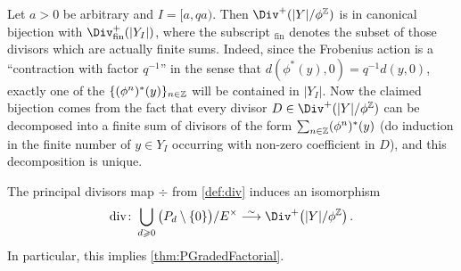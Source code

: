 \documentclass[a4paper, 10pt, oneside, DIV=9, chapterprefix=true, numbers=enddot,bibliography=totoc]{scrbook}
\begin{document}
\begin{rem}\label{rem:Div+}
	Let $a>0$ be arbitrary and $I=[a,qa)$. Then $\Div^+(|Y|/\phi^\IZ)$ is in canonical bijection with $\Div^+_\mathrm{fin}(|Y_I|)$, where the subscript $_\mathrm{fin}$ denotes the subset of those divisors which are actually finite sums. Indeed, since the Frobenius action is a \enquote{contraction with factor $q^{-1}$} in the sense that $d(\phi^*(y),0)=q^{-1}d(y,0)$, exactly one of the $\{(\phi^n)^*(y)\}_{n\in\IZ}$ will be contained in $|Y_I|$. Now the claimed bijection comes from the fact that every divisor $D\in \Div^+(|Y|/\phi^\IZ)$ can be decomposed into a finite sum of divisors of the form $\sum_{n\in\IZ}(\phi^n)^*(y)$ (do induction in the finite number of $y\in Y_I$ occurring with non-zero coefficient in $D$), and this decomposition is unique.
\end{rem}
\begin{thm}
	The principal divisors map $\div$ from \cref{def:div} induces an isomorphism
	\begin{equation*}
		\div\colon\bigcup_{d\geq 0}\big(P_d\setminus\{0\}\big)/E^\times\isomorphism \Div^+\big(|Y|/\phi^\IZ\big)\,.
	\end{equation*}
	In particular, this implies \cref{thm:PGradedFactorial}.
\end{thm}
\end{document}
